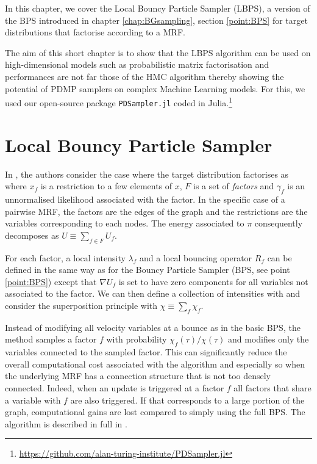 
In this chapter, we cover the Local Bouncy Particle Sampler (LBPS), a version of the BPS introduced in chapter \ref{chap:BGsampling}, section \ref{point:BPS} for target distributions that factorise according to a MRF.

The aim of this short chapter is to show that the LBPS algorithm can be used on high-dimensional models such as probabilistic matrix factorisation and performances are not far those of the HMC algorithm thereby showing the potential of PDMP samplers on complex Machine Learning models. For this, we used our open-source package \texttt{PDSampler.jl} coded in Julia.\footnote{\url{https://github.com/alan-turing-institute/PDSampler.jl}} 

\section{Local Bouncy Particle Sampler}
In \cite{bouchard15}, the authors consider the case where the target distribution factorises as
%
%
where $x_{f}$ is a restriction to a few elements of $x$, $F$ is a set of \emph{factors} and $\gamma_{f}$ is an unnormalised likelihood associated with the factor. In the specific case of a pairwise MRF, the factors are the edges of the graph and the restrictions are the variables corresponding to each nodes. The energy associated to $\pi$ consequently decomposes as $U\equiv \sum_{f\in F}U_{f}$.

For each factor, a local intensity $\lambda_{f}$ and a local bouncing operator $R_{f}$ can be defined in the same way as for the Bouncy Particle Sampler (BPS, see point \ref{point:BPS}) except that $\nabla U_{f}$ is set to have zero components for all variables not associated to the factor. We can then define a collection of intensities with
%
%
and consider the superposition principle with $\chi\equiv\sum_{f} \chi_{f}$.

Instead of modifying all velocity variables at a bounce as in the basic BPS, the method samples a factor $f$ with probability $\chi_{f}(\tau)/\chi(\tau)$ and modifies only the variables connected to the sampled factor. 
This can significantly reduce the overall computational cost associated with the algorithm and especially so when the underlying MRF has a connection structure that is not too densely connected. Indeed, when an update is triggered at a factor $f$ all factors that share a variable with $f$ are also triggered. If that corresponds to a large portion of the graph, computational gains are lost compared to simply using the full BPS. The algorithm is described in full in \citep[chapter 3.3]{bouchard15}.

